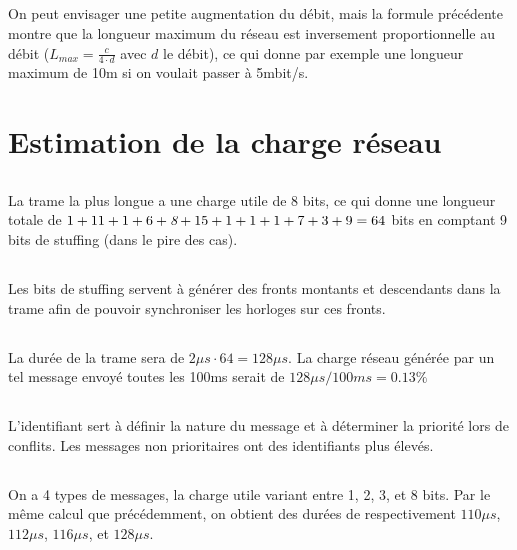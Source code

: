 \documentclass[a4paper]{article}
\begin{document}
\subsection{}
On peut envisager une petite augmentation du débit, mais la formule précédente montre que la longueur maximum du réseau est inversement proportionnelle au débit ($L_{max} = \frac{c}{4 \cdot d}$ avec $d$ le débit), ce qui donne par exemple une longueur maximum de 10m si on voulait passer à 5mbit/s.
  
\section{Estimation de la charge réseau}

\subsection{}
La trame la plus longue a une charge utile de 8 bits, ce qui donne une longueur totale de $1+11+1+6+\emph{8}+15+1+1+1+7+3+9 = 64$ bits en comptant 9 bits de stuffing (dans le pire des cas).

\subsection{}
Les bits de stuffing servent à générer des fronts montants et descendants dans la trame afin de pouvoir synchroniser les horloges sur ces fronts.

\subsection{}
La durée de la trame sera de $2\mu s \cdot 64 = 128 \mu s$. La charge réseau générée par un tel message envoyé toutes les 100ms serait de $128 \mu s / 100 ms = 0.13\%$

\subsection{}
L'identifiant sert à définir la nature du message et à déterminer la priorité lors de conflits. Les messages non prioritaires ont des identifiants plus élevés.

\subsection{}
On a 4 types de messages, la charge utile variant entre 1, 2, 3, et 8 bits. Par le même calcul que précédemment, on obtient des durées de respectivement $110\mu s$, $112\mu s$, $116\mu s$, et $128\mu s$.\\
\end{document}
